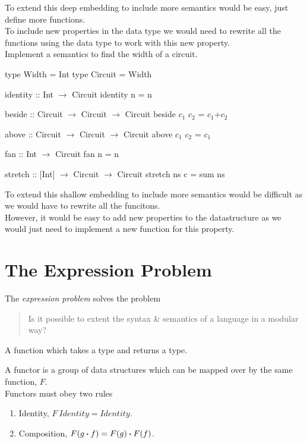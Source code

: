 \documentclass[11pt,a4paper]{article}
\begin{document}
To extend this deep embedding to include more semantics would be easy, just define more functions.\\
To include new properties in the data type we would need to rewrite all the functions using the data type to work with this new property.\\

Implement a semantics to find the width of a circuit.
\begin{code}
type Width   = Int
type Circuit = Width

identity :: Int $\to$ Circuit
identity n = n

beside :: Circuit $\to$ Circuit $\to$ Circuit
beside $c_1$ $c_2$ = $c_1$+$c_2$

above :: Circuit $\to$ Circuit $\to$ Circuit
above $c_1$ $c_2$ = $c_1$

fan :: Int $\to$ Circuit
fan n = n

stretch :: [Int] $\to$ Circuit $\to$ Circuit
stretch ns c = sum ns
\end{code}

To extend this shallow embedding to include more semantics would be difficult as we would have to rewrite all the funcitons.\\
However, it would be easy to add new properties to the datastructure as we would just need to implement a new function for this property.\\

\section{The Expression Problem}

The \textit{expression problem} solves the problem
\begin{quote}
Is it possible to extent the syntax \& semantics of a language in a modular way?
\end{quote}

A function which takes a type and returns a type.%

A functor is a group of data structures which can be mapped over by the same function, $F$.\\
Functors must obey two rules
\begin{enumerate}[label=\roman*)]
  \item Identity, $F\ Identity = Identity$.
  \item Composition, $F(g \boldsymbol{\cdot} f) = F(g) \boldsymbol{\cdot} F(f)$.
\end{enumerate}
\end{document}
